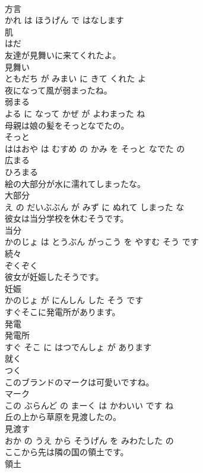 \documentclass[8pt]{extreport}
\begin{document}
\begin{CJK}{UTF8}{min}
\\	方言 
\\	かれ は ほうげん で はなします			
\\	肌	
\\	はだ		
\\	友達が見舞いに来てくれたよ。	
\\	見舞い 
\\	ともだち が みまい に きて くれた よ			
\\	夜になって風が弱まったね。	
\\	弱まる 
\\	よる に なって かぜ が よわまった ね			
\\	母親は娘の髪をそっとなでたの。	
\\	そっと 
\\	ははおや は むすめ の かみ を そっと なでた の			
\\	広まる	
\\	ひろまる		
\\	絵の大部分が水に濡れてしまったな。	
\\	大部分 
\\	え の だいぶぶん が みず に ぬれて しまった な			
\\	彼女は当分学校を休むそうです。	
\\	当分 
\\	かのじょ は とうぶん がっこう を やすむ そう です			
\\	続々	
\\	ぞくぞく		
\\	彼女が妊娠したそうです。	
\\	妊娠 
\\	かのじょ が にんしん した そう です			
\\	すぐそこに発電所があります。	
\\	発電 
\\	発電所 
\\	すぐ そこ に はつでんしょ が あります			
\\	就く	
\\	つく		
\\	このブランドのマークは可愛いですね。	
\\	マーク 
\\	この ぶらんど の まーく は かわいい です ね			
\\	丘の上から草原を見渡したの。	
\\	見渡す 
\\	おか の うえ から そうげん を みわたした の			
\\	ここから先は隣の国の領土です。	
\\	領土 

\end{CJK}
\end{document}
